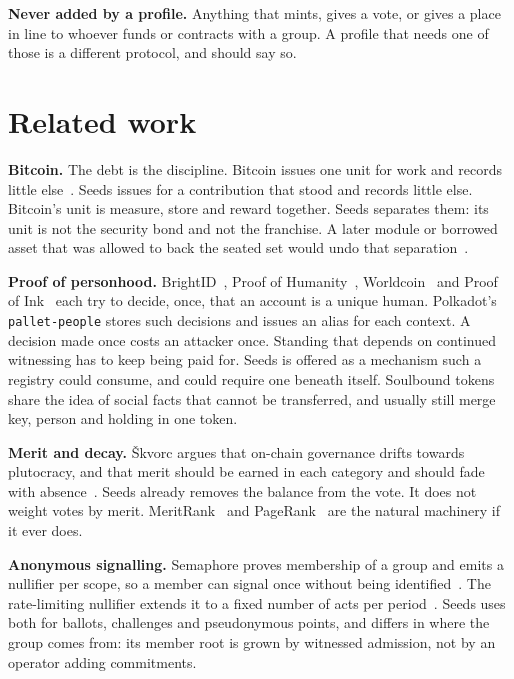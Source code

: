 \documentclass[11pt,a4paper]{article}
\theoremstyle{definition}
\theoremstyle{plain}
\theoremstyle{remark}
\begin{document}
\textbf{Never added by a profile.} Anything that mints, gives a vote, or gives a place in line to whoever funds or contracts with a group. A profile that needs one of those is a different protocol, and should say so.

\section{Related work}
\label{sec:related}

\textbf{Bitcoin.} The debt is the discipline. Bitcoin issues one unit for work and records little else~\cite{nakamoto2008}. Seeds issues for a contribution that stood and records little else. Bitcoin's unit is measure, store and reward together. Seeds separates them: its unit is not the security bond and not the franchise. A later module or borrowed asset that was allowed to back the seated set would undo that separation~\cite{anotherway}.

\textbf{Proof of personhood.} BrightID~\cite{brightid2020}, Proof of Humanity~\cite{poh2021}, Worldcoin~\cite{worldcoin2023} and Proof of Ink~\cite{individuality2026} each try to decide, once, that an account is a unique human. Polkadot's \texttt{pallet-people} stores such decisions and issues an alias for each context. A decision made once costs an attacker once. Standing that depends on continued witnessing has to keep being paid for. Seeds is offered as a mechanism such a registry could consume, and could require one beneath itself. Soulbound tokens~\cite{weyl2022} share the idea of social facts that cannot be transferred, and usually still merge key, person and holding in one token.

\textbf{Merit and decay.} {\v{S}}kvorc argues that on-chain governance drifts towards plutocracy, and that merit should be earned in each category and should fade with absence~\cite{skvorc2023}. Seeds already removes the balance from the vote. It does not weight votes by merit. MeritRank~\cite{nasrulin2022} and PageRank~\cite{pagerank1998} are the natural machinery if it ever does.

\textbf{Anonymous signalling.} Semaphore proves membership of a group and emits a nullifier per scope, so a member can signal once without being identified~\cite{semaphore}. The rate-limiting nullifier extends it to a fixed number of acts per period~\cite{rln}. Seeds uses both for ballots, challenges and pseudonymous points, and differs in where the group comes from: its member root is grown by witnessed admission, not by an operator adding commitments.
\end{document}
